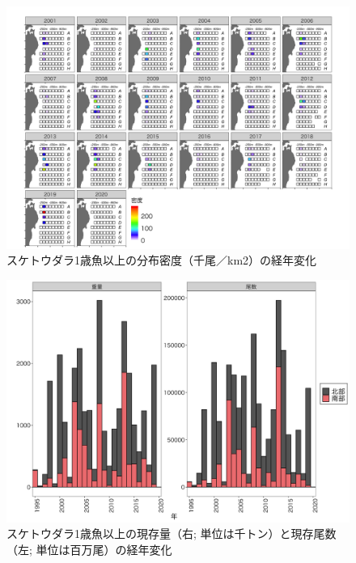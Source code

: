 \documentclass[11pt]{article} %
\begin{document}
\begin{linenumbers}
\begin{figure}[h]
  \centering
  \includegraphics[width = 14cm]{スケトウダラ０＋dens.png}
  \caption{スケトウダラ1歳魚以上の分布密度（千尾／km2）の経年変化}
\end{figure}

\begin{figure}[h]
  \centering
  \includegraphics[width = 14cm]{スケトウダラ０＋trend.png}
  \caption{スケトウダラ1歳魚以上の現存量（右; 単位は千トン）と現存尾数（左; 単位は百万尾）の経年変化}
\end{figure}


\end{linenumbers}
\end{document}
